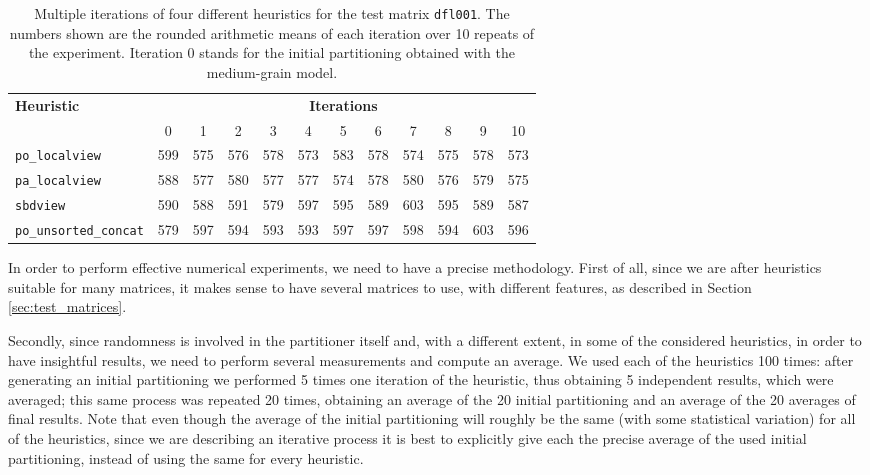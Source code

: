 \begin{table}[h]
	\centering
	\begin{tabular}{|l|c||c|c|c|c|c|c|c|c|c|c|}
		\hline
		\multirow{2}{*}{\textbf{Heuristic}} & \multicolumn{11}{c|}{\textbf{Iterations}} \\ \cline{2-12} 
		& 0 & 1 & 2 & 3 & 4 & 5 & 6 & 7 & 8 & 9 & 10 \\ \hline
		\verb|po_localview| & 599 & 575 & 576 & 578 & 573 & 583 & 578 & 574 & 575 & 578 & 573 \\
		\verb|pa_localview| & 588 & 577 & 580 & 577 & 577 & 574 & 578 & 580 & 576 & 579 & 575  \\
 \verb|sbdview| & 590 & 588 & 591 & 579 & 597 & 595 & 589 & 603 & 595 & 589 & 587 \\
 \verb|po_unsorted_concat| & 579 & 597 & 594 & 593 & 593 & 597 & 597 & 598 & 594 & 603 & 596 \\ 
		\hline
	\end{tabular}
	\caption{Multiple iterations of four different heuristics for the test matrix \texttt{dfl001}. The numbers shown are the rounded arithmetic means of each iteration over 10 repeats of the experiment. Iteration 0 stands for the initial partitioning obtained with the medium-grain model. } \label{tab:iterations}
\end{table}

In order to perform effective numerical experiments, we need to have a precise methodology. First of all, since we are after heuristics suitable for many matrices, it makes sense to have several matrices to use, with different features, as described in Section \ref{sec:test_matrices}. 

Secondly, since randomness is involved in the partitioner itself and, with a different extent, in some of the considered heuristics, in order to have insightful results, we need to perform several measurements and compute an average. We used each of the heuristics 100 times: after generating an initial partitioning we performed 5 times one iteration of the heuristic, thus obtaining 5 independent results, which were averaged; this same process was repeated 20 times, obtaining an average of the 20 initial partitioning and an average of the 20 averages of final results. Note that even though the average of the initial partitioning will roughly be the same (with some statistical variation) for all of the heuristics, since we are describing an iterative process it is best to explicitly give each the precise average of the used initial partitioning, instead of using the same for every heuristic.

